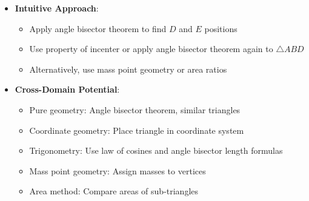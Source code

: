 \documentclass[12pt]{article}
\begin{document}
\begin{problemconfigbox}
\begin{itemize}[leftmargin=*]
    \item \textbf{Intuitive Approach}: 
    \begin{itemize}
        \item Apply angle bisector theorem to find $D$ and $E$ positions
        \item Use property of incenter or apply angle bisector theorem again to $\triangle ABD$
        \item Alternatively, use mass point geometry or area ratios
    \end{itemize}
    
    \item \textbf{Cross-Domain Potential}: 
    \begin{itemize}
        \item Pure geometry: Angle bisector theorem, similar triangles
        \item Coordinate geometry: Place triangle in coordinate system
        \item Trigonometry: Use law of cosines and angle bisector length formulas
        \item Mass point geometry: Assign masses to vertices
        \item Area method: Compare areas of sub-triangles
    \end{itemize}
\end{itemize}
\end{problemconfigbox}
\end{document}
